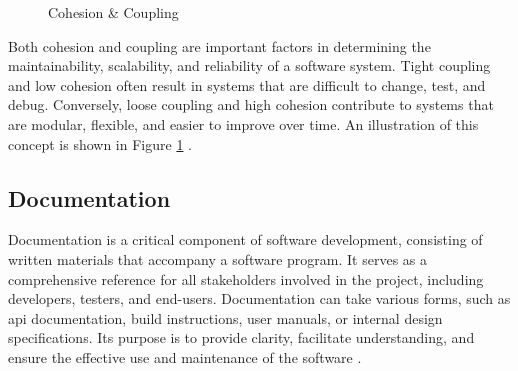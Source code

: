 {\begin{figure}[h!]
    \centering

    \caption[Cohesion \& Coupling]{Cohesion \& Coupling \cite{geeksforgeeks:c&c}}
    \label{fig:cohesion-coupling}
\end{figure}

Both cohesion and coupling are important factors in determining the maintainability, scalability, and reliability of a software system. Tight coupling and low cohesion often result in systems that are difficult to change, test, and debug. Conversely, loose coupling and high cohesion contribute to systems that are modular, flexible, and easier to improve over time. An illustration of this concept is shown in Figure \ref{fig:cohesion-coupling} \cite{geeksforgeeks:c&c}.

\newpage

\subsection{Documentation}
\label{subsec:documentation}

Documentation is a critical component of software development, consisting of written materials that accompany a software program. It serves as a comprehensive reference for all stakeholders involved in the project, including developers, testers, and end-users. Documentation can take various forms, such as \gls{api} documentation, build instructions, user manuals, or internal design specifications. Its purpose is to provide clarity, facilitate understanding, and ensure the effective use and maintenance of the software \cite{geeksforgeeks:doc}. \\

}
